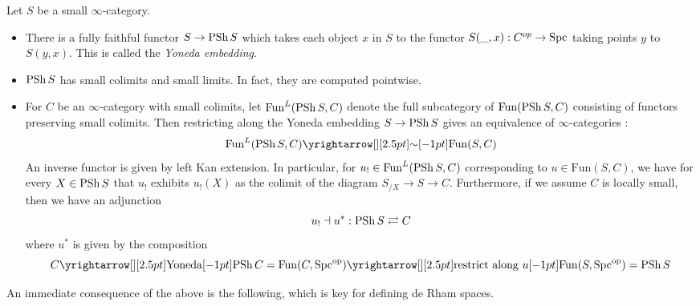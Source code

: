 \documentclass[./main.tex]{subfiles}
\begin{document}
\begin{prop}

  Let $S$ be a small $\infty$-category.
  \begin{itemize}
    \item There is a fully faithful functor $S \to \mathrm{PSh}\,S$
    which takes each object $x$ in $S$ to the functor 
    $S(\_ , x) : C^{op} \to \mathrm{Spc}$ taking points $y$ to $S(y,x)$.
    This is called the \emph{Yoneda embedding}.
    \item \cite[Prop 5.1.2.3]{Lurie-HTT}
    $\mathrm{PSh}\,S$ has small colimits and small limits.
    In fact, they are computed pointwise.
    \item \cite[Prop 5.1.5.6, 5.2.6.5]{Lurie-HTT}
    For $C$ be an $\infty$-category with small colimits, 
    let $\mathrm{Fun}^L(\mathrm{PSh}\, S , C)$ denote the
    full subcategory of $\mathrm{Fun}(\mathrm{PSh}\, S, C)$ consisting of
    functors preserving small colimits.
    Then restricting along the Yoneda embedding $S \to \mathrm{PSh}\, S$
    gives an equivalence of $\infty$-categories : 
    \[
      \mathrm{Fun}^L(\PSH\, S , C) \map{\sim}{} \mathrm{Fun}(S , C)  
    \]
    An inverse functor is given by left Kan extension.
    In particular,
    for $u_! \in \mathrm{Fun}^L(\mathrm{PSh}\, S , C)$ corresponding to 
    $u \in \mathrm{Fun}(S , C)$,
    we have for every $X \in \mathrm{PSh}\, S$ that
    $u_!$ exhibits $u_!(X)$ as the colimit of the diagram 
    $S_{/ X} \to S \to C$.
    Furthermore, if we assume $C$ is locally small,
    then we have an adjunction 
    \[
      u_! \dashv u^* : \mathrm{PSh}\,S \rightleftarrows C
    \]
    where $u^*$ is given by the composition 
    \[
      C \map{\text{Yoneda}}{} \PSH\,C = \FUN(C,\SPC^\OP) 
      \map{\text{restrict along $u$}}{} \FUN(S,\SPC^\OP) = \PSH\,S
    \]
  \end{itemize}
\end{prop}

An immediate consequence of the above is the following,
which is key for defining de Rham spaces.
\end{document}
